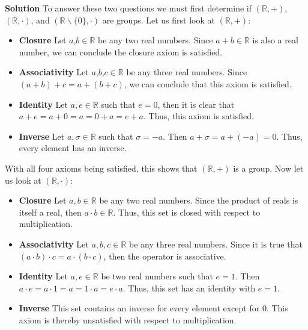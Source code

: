 \documentclass[12pt, a4paper]{article}
\begin{document}
\begin{flushleft}
\textbf{Solution} To answer these two questions we must first determine if $(\mathbb{R}, +)$, $(\mathbb{R}, \cdot)$, and $(\mathbb{R}\backslash \{ 0\}, \cdot)$ are groups. Let us first look at $(\mathbb{R}, +)$:\linebreak

\begin{itemize}
\item \textbf{Closure} Let $a$,$b\in \mathbb{R}$ be any two real numbers. Since $a+b\in \mathbb{R}$ is also a real number, we can conclude the closure axiom is satisfied.
\item \textbf{Associativity} Let $a$,$b$,$c\in \mathbb{R}$ be any three real numbers. Since $(a+b)+c=a+(b+c)$, we can conclude that this axiom is satisfied.
\item \textbf{Identity} Let $a,e\in \mathbb{R}$ such that $e=0$, then it is clear that $a+e=a+0=a=0+a=e+a$. Thus, this axiom is satisfied.
\item \textbf{Inverse} Let $a,\sigma \in \mathbb{R}$ such that $\sigma=-a$. Then $a+\sigma=a+(-a)=0$. Thus, every element has an inverse. 
\end{itemize}
\vspace*{5mm}

With all four axioms being satisfied, this shows that $(\mathbb{R}, +)$ is a group. Now let us look at $(\mathbb{R}, \cdot)$:\linebreak

\begin{itemize}
\item \textbf{Closure} Let $a,b\in \mathbb{R}$ be any two real numbers. Since the product of reals is itself a real, then $a\cdot b\in \mathbb{R}$. Thus, this set is closed with respect to multiplication.
\item \textbf{Associativity} Let $a,b,c\in \mathbb{R}$ be any three real numbers. Since it is true that $(a\cdot b)\cdot c=a\cdot (b\cdot c)$, then the operator is associative.
\item \textbf{Identity} Let $a,e\in \mathbb{R}$ be two real numbers such that $e=1$. Then $a\cdot e=a\cdot 1=a=1\cdot a=e\cdot a$. Thus, this set has an identity with $e=1$. 
\item \textbf{Inverse} This set contains an inverse for every element except for $0$. This axiom is thereby unsatisfied with respect to multiplication.
\end {itemize}
\vspace*{5mm}


\end{flushleft}
\end{document}
